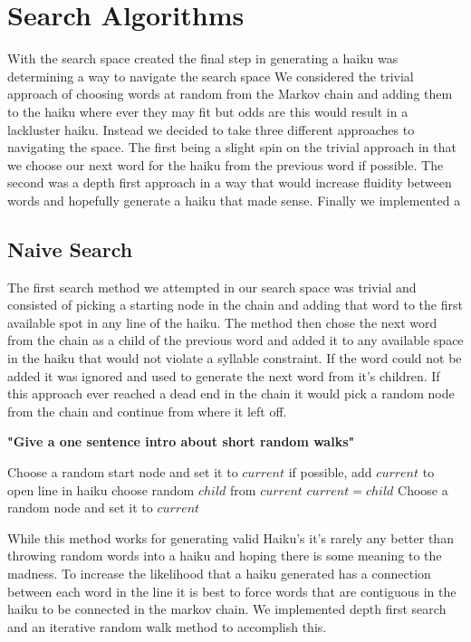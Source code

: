 \documentclass[]{article}
\newcommand{\comment}[1]
{\par {\bfseries \color{green} #1 \par}}
\begin{document}
\section{Search Algorithms}
With the search space created the final step in generating a haiku was determining a way to navigate the search space We considered the trivial approach of choosing words at random from the Markov chain and adding them to the haiku where ever they may fit but odds are this would result in a lackluster haiku. Instead we decided to take three different approaches to navigating the space. The first being a slight spin on the trivial approach in that we choose our next word for the haiku from the previous word if possible. The second was a depth first approach in a way that would increase fluidity between words and hopefully generate a haiku that made sense. Finally we implemented a 

\subsection{Naive Search}
The first search method we attempted in our search space was trivial and consisted of picking a starting node in the chain and adding that word to the first available spot in any line of the haiku. The method then chose the next word from the chain as a child of the previous word and added it to any available space in the haiku that would not violate a syllable constraint. If the word could not be added it was ignored and used to generate the next word from it's children. If this approach ever reached a dead end in the chain it would pick a random node from the chain and continue from where it left off.\comment{"Give a one sentence intro about short random walks"}

\begin{algorithm}[H]
	\caption{$Naive\_Search()$} \label{Naive}
	\begin{algorithmic}[1]
		\State Choose a random start node and set it to $current$
			\State if possible, add $current$ to open line in haiku
				\State choose random $child$ from $current$
				\State $current = child$
			\Else
				\State Choose a random node and set it to $current$
			\EndIf
		\EndWhile
	\end{algorithmic}
\end{algorithm}

While this method works for generating valid Haiku's it's rarely any better than throwing random words into a haiku and hoping there is some meaning to the madness. To increase the likelihood that a haiku generated has a connection between each word in the line it is best to force words that are contiguous in the haiku to be connected in the markov chain. We implemented depth first search and an iterative random walk method to accomplish this.
\end{document}
